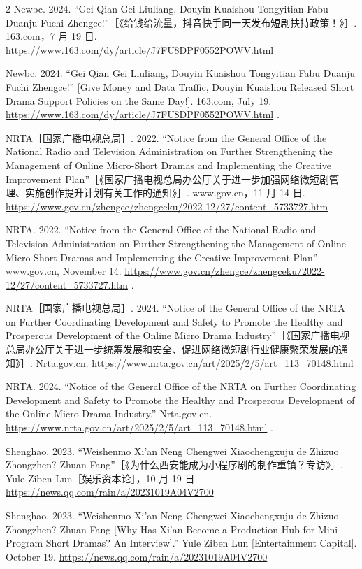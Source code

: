 \documentclass[10pt,a4paper]{article}
\begin{document}
\begin{paracol}{2}
Newbc. 2024. “Gei Qian Gei Liuliang, Douyin Kuaishou Tongyitian Fabu Duanju Fuchi Zhengce!”［《给钱给流量，抖音快手同一天发布短剧扶持政策！》］. 163.com，7 月 19 日. \url{https://www.163.com/dy/article/J7FU8DPF0552POWV.html}\par
\switchcolumn
Newbc. 2024. “Gei Qian Gei Liuliang, Douyin Kuaishou Tongyitian Fabu Duanju Fuchi Zhengce!” [Give Money and Data Traffic, Douyin Kuaishou Released Short Drama Support Policies on the Same Day!]. 163.com, July 19. \url{https://www.163.com/dy/article/J7FU8DPF0552POWV.html} .\par
\switchcolumn*
NRTA［国家广播电视总局］. 2022. “Notice from the General Office of the National Radio and Television Administration on Further Strengthening the Management of Online Micro-Short Dramas and Implementing the Creative Improvement Plan”［《国家广播电视总局办公厅关于进一步加强网络微短剧管理、实施创作提升计划有关工作的通知》］. www.gov.cn，11 月 14 日. \url{https://www.gov.cn/zhengce/zhengceku/2022-12/27/content_5733727.htm}\par
\switchcolumn
NRTA. 2022. “Notice from the General Office of the National Radio and Television Administration on Further Strengthening the Management of Online Micro-Short Dramas and Implementing the Creative Improvement Plan” www.gov.cn, November 14. \url{https://www.gov.cn/zhengce/zhengceku/2022-12/27/content_5733727.htm} .\par
\switchcolumn*
NRTA［国家广播电视总局］. 2024. “Notice of the General Office of the NRTA on Further Coordinating Development and Safety to Promote the Healthy and Prosperous Development of the Online Micro Drama Industry”［《国家广播电视总局办公厅关于进一步统筹发展和安全、促进网络微短剧行业健康繁荣发展的通知》］. Nrta.gov.cn. \url{https://www.nrta.gov.cn/art/2025/2/5/art_113_70148.html}\par
\switchcolumn
NRTA. 2024. “Notice of the General Office of the NRTA on Further Coordinating Development and Safety to Promote the Healthy and Prosperous Development of the Online Micro Drama Industry.” Nrta.gov.cn. \url{https://www.nrta.gov.cn/art/2025/2/5/art_113_70148.html} .\par
\switchcolumn*
Shenghao. 2023. “Weishenmo Xi’an Neng Chengwei Xiaochengxuju de Zhizuo Zhongzhen? Zhuan Fang”［《为什么西安能成为小程序剧的制作重镇？专访》］. Yule Ziben Lun［娱乐资本论］，10 月 19 日. \url{https://news.qq.com/rain/a/20231019A04V2700}\par
\switchcolumn
Shenghao. 2023. “Weishenmo Xi’an Neng Chengwei Xiaochengxuju de Zhizuo Zhongzhen? Zhuan Fang [Why Has Xi’an Become a Production Hub for Mini-Program Short Dramas? An Interview].” Yule Ziben Lun [Entertainment Capital]. October 19. \url{https://news.qq.com/rain/a/20231019A04V2700}\par

\end{paracol}
\end{document}

